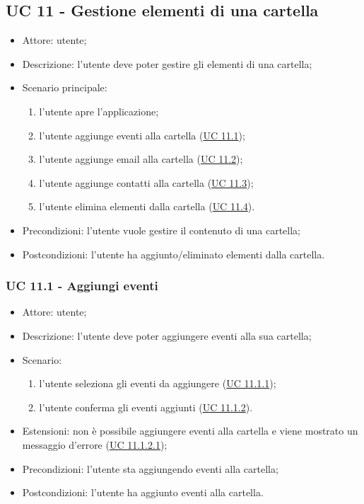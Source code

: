     \subsection{UC 11 - Gestione elementi di una cartella}
        \begin{itemize}
            \item Attore: utente;
            \item Descrizione: l'utente deve poter gestire gli elementi di una cartella;
            \item Scenario principale:
                \begin{enumerate}
                \item l’utente apre l'applicazione;
                \item l’utente aggiunge eventi alla cartella (\hyperref[sec: UC 11.1]{UC 11.1});
                \item l’utente aggiunge email alla cartella (\hyperref[sec: UC 11.2]{UC 11.2});
                \item l’utente aggiunge contatti alla cartella (\hyperref[sec: UC 11.3]{UC 11.3});
                \item l’utente elimina elementi dalla cartella (\hyperref[sec: UC 11.4]{UC 11.4}).
                \end{enumerate}
            \item Precondizioni: l'utente vuole gestire il contenuto di una cartella;
            \item Postcondizioni: l'utente ha aggiunto/eliminato elementi dalla cartella.
        \end{itemize}
    \subsubsection{UC 11.1 - Aggiungi eventi} \label{sec: UC 11.1}
    \begin{itemize}
        \item Attore: utente;
        \item Descrizione: l'utente deve poter aggiungere eventi alla sua cartella;
        \item Scenario:
        \begin{enumerate}
        \item l'utente seleziona gli eventi da aggiungere (\hyperref[sec: UC 11.1.1]{UC 11.1.1});
        \item l'utente conferma gli eventi aggiunti (\hyperref[sec: UC 11.1.2]{UC 11.1.2}).
        \end{enumerate}
        \item Estensioni: non è possibile aggiungere eventi alla cartella e viene mostrato un messaggio d'errore (\hyperref[sec: UC 11.1.2.1]{UC 11.1.2.1});
        \item Precondizioni: l'utente sta aggiungendo eventi alla cartella;
        \item Postcondizioni: l'utente ha aggiunto eventi alla cartella.
    \end{itemize}
